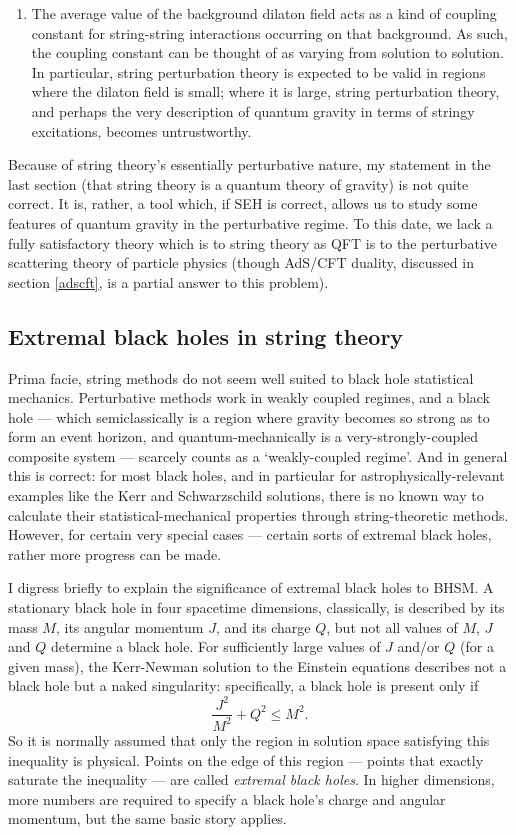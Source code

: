 \documentclass{article}
\newcommand{\be}{\begin{equation}}
\newcommand{\ee}{\end{equation}}
\begin{document}
\begin{enumerate}
\item The average value of the background dilaton field acts as a kind of coupling constant for string-string interactions occurring on that background. As such, the coupling constant can be thought of as varying from solution to solution. In particular, string perturbation theory is expected to be valid in regions where the dilaton field is small; where it is large, string perturbation theory, and perhaps the very description of quantum gravity in terms of stringy excitations, becomes untrustworthy.
\end{enumerate}
Because of string theory's essentially perturbative nature, my statement in the last section (that string theory is a quantum theory of gravity) is not quite correct. It is, rather, a tool which, if SEH is correct, allows us to study some features of quantum gravity in the perturbative regime. To this date, we lack a fully satisfactory theory which is to string theory as QFT is to the perturbative scattering theory of particle physics (though AdS/CFT duality, discussed in section \ref{adscft}, is a partial answer to this problem).

\subsection{Extremal black holes in string theory}\label{string-extremal}

Prima facie, string methods do not seem well suited to black hole statistical mechanics. Perturbative methods work in weakly coupled regimes, and a black hole --- which semiclassically is a region where gravity becomes so strong as to form an event horizon, and quantum-mechanically is a very-strongly-coupled composite system --- scarcely counts as a `weakly-coupled regime'. And in general this is correct: for most black holes, and in particular for astrophysically-relevant examples like the Kerr and Schwarzschild solutions, there is no known way to calculate their statistical-mechanical properties through string-theoretic methods. However, for certain very special cases --- certain sorts of extremal black holes, rather more progress can be made.

I digress briefly to explain the significance of extremal black holes to BHSM. A stationary black hole in four spacetime dimensions, classically, is described by its mass $M$, its angular momentum $J$, and its charge $Q$, but not all values of $M$, $J$ and $Q$ determine a black hole. For sufficiently large values of $J$ and/or $Q$ (for a given mass), the Kerr-Newman solution to the Einstein equations describes not a black hole but a naked singularity: specifically, a black hole is present only if
\be
\frac{J^2}{M^2} + Q^2 \leq M^2.
\ee
 So it is normally assumed that only the region in solution space satisfying this inequality is physical. Points on the edge of this region --- points that exactly saturate the inequality --- are called \emph{extremal black holes}. In higher dimensions, more numbers are required to specify a black hole's charge and angular momentum, but the same basic story applies.
 
\end{document}
